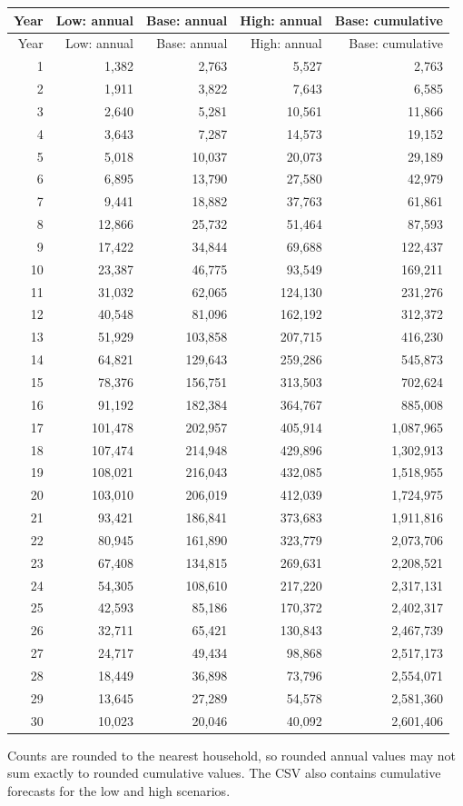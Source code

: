 \documentclass[11pt,a4paper]{article}
\begin{document}
{\small
\begin{longtable}{rrrrr}
\toprule
Year & Low: annual & Base: annual & High: annual & Base: cumulative \\
\midrule
\endfirsthead
\toprule
Year & Low: annual & Base: annual & High: annual & Base: cumulative \\
\midrule
\endhead
1 & 1,382 & 2,763 & 5,527 & 2,763 \\
2 & 1,911 & 3,822 & 7,643 & 6,585 \\
3 & 2,640 & 5,281 & 10,561 & 11,866 \\
4 & 3,643 & 7,287 & 14,573 & 19,152 \\
5 & 5,018 & 10,037 & 20,073 & 29,189 \\
6 & 6,895 & 13,790 & 27,580 & 42,979 \\
7 & 9,441 & 18,882 & 37,763 & 61,861 \\
8 & 12,866 & 25,732 & 51,464 & 87,593 \\
9 & 17,422 & 34,844 & 69,688 & 122,437 \\
10 & 23,387 & 46,775 & 93,549 & 169,211 \\
11 & 31,032 & 62,065 & 124,130 & 231,276 \\
12 & 40,548 & 81,096 & 162,192 & 312,372 \\
13 & 51,929 & 103,858 & 207,715 & 416,230 \\
14 & 64,821 & 129,643 & 259,286 & 545,873 \\
15 & 78,376 & 156,751 & 313,503 & 702,624 \\
16 & 91,192 & 182,384 & 364,767 & 885,008 \\
17 & 101,478 & 202,957 & 405,914 & 1,087,965 \\
18 & 107,474 & 214,948 & 429,896 & 1,302,913 \\
19 & 108,021 & 216,043 & 432,085 & 1,518,955 \\
20 & 103,010 & 206,019 & 412,039 & 1,724,975 \\
21 & 93,421 & 186,841 & 373,683 & 1,911,816 \\
22 & 80,945 & 161,890 & 323,779 & 2,073,706 \\
23 & 67,408 & 134,815 & 269,631 & 2,208,521 \\
24 & 54,305 & 108,610 & 217,220 & 2,317,131 \\
25 & 42,593 & 85,186 & 170,372 & 2,402,317 \\
26 & 32,711 & 65,421 & 130,843 & 2,467,739 \\
27 & 24,717 & 49,434 & 98,868 & 2,517,173 \\
28 & 18,449 & 36,898 & 73,796 & 2,554,071 \\
29 & 13,645 & 27,289 & 54,578 & 2,581,360 \\
30 & 10,023 & 20,046 & 40,092 & 2,601,406 \\
\bottomrule
\end{longtable}
}
Counts are rounded to the nearest household, so rounded annual values may not sum exactly to rounded cumulative values. The CSV also contains cumulative forecasts for the low and high scenarios.
\end{document}
